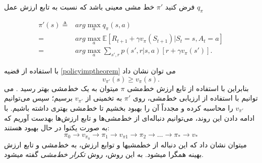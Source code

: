 فرض کنید $\pi'$ خط مشی معینی باشد که نسبت به تابع ارزش عمل 
$q_\pi$
	
\begin{align*}
\pi'(s) \triangleq& arg\max_{a} q_\pi(s,a) \\
= & arg\max_{a} \mathbb{E}\left[R_{t+1} + \gamma v_\pi(S_{t+1}) | S_t = s, A_t = a\right] \\
= & arg \max_{a} \sum_{s',r} p(s',r|s,a) \left[r + \gamma v_\pi(s')\right].\end{align*}

با استفاده از قضیه \ref{policyimptheorem} می توان نشان داد
 $$v_{\pi'}(s) \ge v_{\pi}(s).$$
بنابراین با استفاده از تابع ارزش خط‌مشی $\pi$ می\nf توان به یک خط‌مشی بهتر رسید \cite{suttonbook}. می توانیم با استفاده از ارزیابی خط‌مشی، روی $\pi'$ به تخمینی از $v_{\pi'}$ برسیم؛ سپس می‌توانیم
$v_{\pi'}$
    را محاسبه کرده و مجدداً آن را بهبود بخشیم تا خط‌مشی بهتری داشته باشیم. با ادامه دادن این روند، می‌توانیم دنباله‌ای از خط‌مشی‌ها و تابع ارزش‌ها بهدست آوریم که به صورت یکنوا در حال بهبود هستند:
$$\pi_0 \longrightarrow v_{\pi_0} \longrightarrow \pi_1 \longrightarrow v_{\pi{1}} \longrightarrow \pi_2 \longrightarrow \dots \longrightarrow \pi_* \longrightarrow v_*$$
می\nf توان نشان داد که این دنباله از خط\nf مشی\nf ها و توابع ارزش، به خط‌مشی و تابع ارزش بهینه همگرا می\nf شود.
به این روش، روش \textit{تکرار خط‌مشی}  
گفته می\nf شود.
